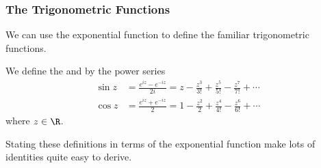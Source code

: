 

\subsubsection{The Trigonometric Functions}

We can use the exponential function to define the familiar trigonometric functions.

\begin{definition}
	We define the  and  by the power series
	\begin{align*}
		\sin z &= \frac{e^{iz} - e^{-iz}}{2i} = z - \frac{z^3}{3!} + \frac{z^5}{5!} - \frac{z^7}{7!} + \cdots \\
		\cos z &= \frac{e^{iz} + e^{-iz}}{2} = 1 - \frac{z^2}{2} + \frac{z^4}{4!} - \frac{z^6}{6!} + \cdots
	\end{align*}
	where $z \in \R$.
\end{definition}

Stating these definitions in terms of the exponential function make lots of identities quite easy to derive.

